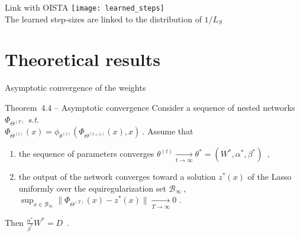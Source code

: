 \documentclass{beamer}
\begin{document}
\begin{frame}{Link with OISTA}
    \centering
    \texttt{[image: learned\_steps]}\\
    The learned step-sizes are linked to the distribution of $1/L_S$\\[2em]

\end{frame}

\section{Theoretical results}



\begin{frame}{Asymptotic convergence of the weights}
    

\begin{block}{Theorem~4.4 -- Asymptotic convergence}  
    Consider a sequence of nested networks $\Phi_{\Theta^{(T)}}$ \emph{s.t.}\\
    $\Phi_{\Theta^{(t)}}(x) = \phi_{\theta^{(t)}}(\Phi_{\Theta^{(t + 1)}}(x), x)~.$
    Assume that
    \begin{enumerate}
        \item\label{hyp:theta_cvg} the sequence of parameters converges \ie{}
        $\theta^{(t)} \xrightarrow[t\to\infty]{} \theta^* = (W^*, \alpha^*, \beta^*) \enspace ,$
        \item\label{hyp:out_cvg} the output of the network converges toward a solution $z^*(x)$ of the Lasso uniformly over the equiregularization set $\mathcal B_\infty~,$ \ie{} $\sup_{x \in \mathcal B_\infty}\|\Phi_{\Theta^{(T)}}(x) - z^*(x)\| \xrightarrow[T \to \infty]{} 0$ \enspace.
    \end{enumerate}
    Then $\frac{\alpha^*}{\beta^*}W^* = D \enspace .$
\end{block}
\end{frame}
\end{document}
